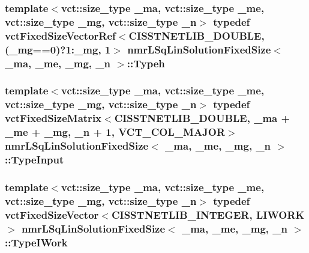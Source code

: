 \subsubsection[{Typeh}]{\setlength{\rightskip}{0pt plus 5cm}template$<$vct\+::size\+\_\+type \+\_\+ma, vct\+::size\+\_\+type \+\_\+me, vct\+::size\+\_\+type \+\_\+mg, vct\+::size\+\_\+type \+\_\+n$>$ typedef {\bf vct\+Fixed\+Size\+Vector\+Ref}$<$C\+I\+S\+S\+T\+N\+E\+T\+L\+I\+B\+\_\+\+D\+O\+U\+B\+L\+E, (\+\_\+mg==0)?1\+:\+\_\+mg, 1$>$ {\bf nmr\+L\+Sq\+Lin\+Solution\+Fixed\+Size}$<$ \+\_\+ma, \+\_\+me, \+\_\+mg, \+\_\+n $>$\+::{\bf Typeh}}\label{classnmr_l_sq_lin_solution_fixed_size_aa86f02bad0142d8bccac845d426bb153}
\hypertarget{classnmr_l_sq_lin_solution_fixed_size_adf9a982c0414dafb9fb1164b8da4f96f}{}
\subsubsection[{Type\+Input}]{\setlength{\rightskip}{0pt plus 5cm}template$<$vct\+::size\+\_\+type \+\_\+ma, vct\+::size\+\_\+type \+\_\+me, vct\+::size\+\_\+type \+\_\+mg, vct\+::size\+\_\+type \+\_\+n$>$ typedef {\bf vct\+Fixed\+Size\+Matrix}$<$C\+I\+S\+S\+T\+N\+E\+T\+L\+I\+B\+\_\+\+D\+O\+U\+B\+L\+E, \+\_\+ma + \+\_\+me + \+\_\+mg, \+\_\+n + 1, {\bf V\+C\+T\+\_\+\+C\+O\+L\+\_\+\+M\+A\+J\+O\+R}$>$ {\bf nmr\+L\+Sq\+Lin\+Solution\+Fixed\+Size}$<$ \+\_\+ma, \+\_\+me, \+\_\+mg, \+\_\+n $>$\+::{\bf Type\+Input}}\label{classnmr_l_sq_lin_solution_fixed_size_adf9a982c0414dafb9fb1164b8da4f96f}
\hypertarget{classnmr_l_sq_lin_solution_fixed_size_a1838601b0a3e6fa7972e8854b888152a}{}
\subsubsection[{Type\+I\+Work}]{\setlength{\rightskip}{0pt plus 5cm}template$<$vct\+::size\+\_\+type \+\_\+ma, vct\+::size\+\_\+type \+\_\+me, vct\+::size\+\_\+type \+\_\+mg, vct\+::size\+\_\+type \+\_\+n$>$ typedef {\bf vct\+Fixed\+Size\+Vector}$<$C\+I\+S\+S\+T\+N\+E\+T\+L\+I\+B\+\_\+\+I\+N\+T\+E\+G\+E\+R, {\bf L\+I\+W\+O\+R\+K}$>$ {\bf nmr\+L\+Sq\+Lin\+Solution\+Fixed\+Size}$<$ \+\_\+ma, \+\_\+me, \+\_\+mg, \+\_\+n $>$\+::{\bf Type\+I\+Work}}\label{classnmr_l_sq_lin_solution_fixed_size_a1838601b0a3e6fa7972e8854b888152a}
\hypertarget{classnmr_l_sq_lin_solution_fixed_size_a384dc1235386018c6edbdc782c5f84be}{}
